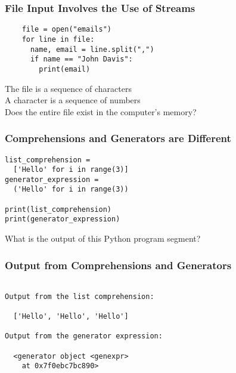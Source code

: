 \documentclass[14pt,aspectratio=169]{beamer}
\begin{document}
%
\begin{frame}[fragile]
  \frametitle{File Input Involves the Use of Streams}
  \normalsize
  \hspace*{-.65in}
  \begin{minipage}{6in}
    \vspace*{.25in}
    \begin{verbatim}
    file = open("emails")
    for line in file:
      name, email = line.split(",")
      if name == "John Davis":
        print(email)
    \end{verbatim}
  \end{minipage}
  \vspace*{.25in}
  \begin{center}
    \normalsize \noindent The file is a sequence of characters \\
    \normalsize \noindent A character is a sequence of numbers \\
    \normalsize \noindent Does the entire file exist in the computer's
    memory? \\
  \end{center}
\end{frame}

%
\begin{frame}[fragile]
  \frametitle{Comprehensions and Generators are Different}
  \normalsize
  \begin{minipage}{6in}
    \vspace*{.2in}
    \begin{verbatim}
list_comprehension =
  ['Hello' for i in range(3)]
generator_expression =
  ('Hello' for i in range(3))

print(list_comprehension)
print(generator_expression)
    \end{verbatim}
  \end{minipage}
  \vspace*{.05in}
  \begin{center}
    \normalsize \noindent What is the output of this Python program segment? \\
  \end{center}
\end{frame}

%
\begin{frame}[fragile]
  \frametitle{Output from Comprehensions and Generators}
  \normalsize
  \begin{minipage}{6in}
    \vspace*{.2in}
    \begin{verbatim}

Output from the list comprehension:

  ['Hello', 'Hello', 'Hello']

Output from the generator expression:

  <generator object <genexpr>
    at 0x7f0ebc7bc890>

    \end{verbatim}
  \end{minipage}
\end{frame}
\end{document}
